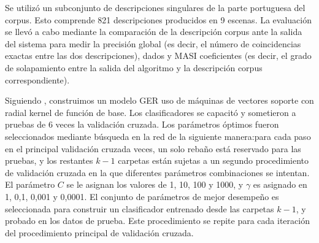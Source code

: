 

Se utiliz\'o un subconjunto de descripciones singulares de la parte portuguesa del corpus. Esto comprende 821 descripciones producidos en 9 escenas. La evaluaci\'on se llev\'o a cabo mediante la comparaci\'on de la descripci\'on corpus ante la salida del sistema para medir la precisi\'on global (es decir, el n\'umero de coincidencias exactas entre las dos descripciones), dados \cite{dice} y MASI \cite{masi} coeficientes (es decir, el grado de solapamiento entre la salida del algoritmo y la descripci\'on corpus correspondiente).

Siguiendo \cite{thiago-svm}, construimos un modelo GER uso de m\'aquinas de vectores soporte con radial kernel de funci\'on de base. Los clasificadores se capacit\'o y sometieron a pruebas de 6 veces la validaci\'on cruzada. Los par\'ametros \'optimos fueron seleccionados mediante b\'usqueda en la red de la siguiente manera:para cada paso en el principal validaci\'on cruzada veces, un solo reba\~no est\'a reservado para las pruebas, y los restantes $k-1$ carpetas est\'an sujetas a un segundo procedimiento de validaci\'on cruzada en la que diferentes par\'ametros combinaciones se intentan. El par\'ametro $C$ se le asignan los valores de 1, 10, 100 y 1000, y $\gamma$ es asignado en 1, 0,1, 0,001 y 0,0001. El conjunto de par\'ametros de mejor desempe\~no es seleccionada para construir un clasificador entrenado desde las carpetas $k-1$, y probado en los datos de prueba. Este procedimiento se repite para cada iteraci\'on del procedimiento principal de validaci\'on cruzada.
